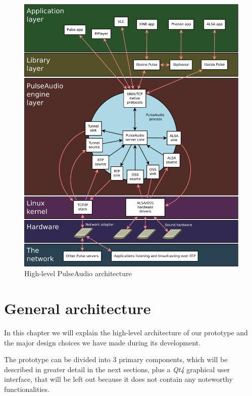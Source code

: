 \documentclass[conference]{IEEEtran}
\begin{document}
\begin{figure}[h]
\centering
\includegraphics[width=\columnwidth]{PulseAudio}
\caption{High-level PulseAudio architecture}
\label{pa}
\end{figure}


\section{General architecture}
In this chapter we will explain the high-level architecture of our prototype and the major design choices we have made during its development.

The prototype can be divided into 3 primary components, which will be described in greater detail in the next sections, plus a \textsl{Qt4} graphical user interface, that will be left out because it does not contain any noteworthy functionalities.
\end{document}
